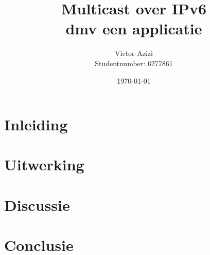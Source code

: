 \documentclass{report}
\begin{document}
\title{Multicast over IPv6 \\ dmv een applicatie}
\author{Victor Azizi \\ Studentnumber: 6277861}
\maketitle
\date{\today}
\section{Inleiding}

\section{Uitwerking}

\section{Discussie}

\section{Conclusie}
\end{document}

